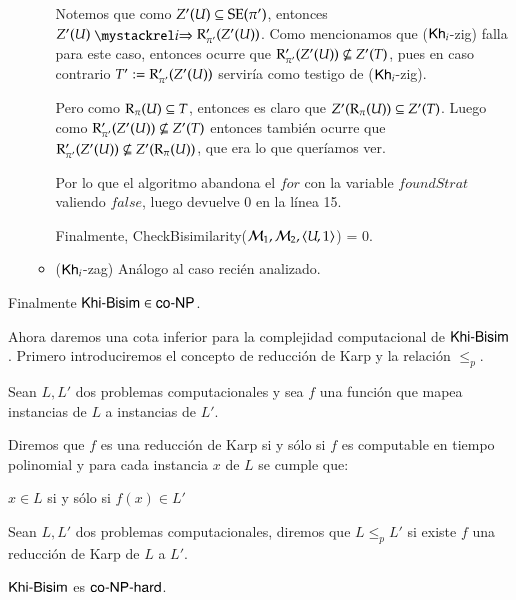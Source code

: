 \begin{demostracion}
\begin{itemize}
\begin{itemize}
            Notemos que como $Z'(U) \subseteq \mathrm{SE}(\pi')$, entonces $Z'(U) \ultsExecAgi \R'_{\pi'}(Z'(U))$. 
            Como mencionamos que ($\mathsf{Kh}_i$-zig) falla para este caso, entonces ocurre que 
            $\mathrm{R}'_{\pi'}(Z'(U)) \not \subseteq Z'(T)$, pues en caso contrario $T' := \mathrm{R}'_{\pi'}(Z'(U))$ serviría como 
            testigo de ($\mathsf{Kh}_i$-zig).

            Pero como $\mathrm{R}_\pi(U) \subseteq T$, entonces es claro que $Z'(\mathrm{R}_\pi(U)) \subseteq Z'(T)$. Luego como 
            $\mathrm{R}'_{\pi'}(Z'(U)) \not \subseteq Z'(T)$ entonces también ocurre que $\mathrm{R}'_{\pi'}(Z'(U)) \not \subseteq Z'(\mathrm{R}_\pi(U))$, 
            que era lo que queríamos ver.

            Por lo que el algoritmo abandona el $for$ con la variable $foundStrat$ valiendo $false$, luego devuelve 0 en la línea 15.

            Finalmente, CheckBisimilarity($\mathcal{M}_1,\mathcal{M}_2,\langle U,1 \rangle$) = 0.

            \item ($\mathsf{Kh}_i$-zag) Análogo al caso recién analizado.
        \end{itemize}
    \end{itemize}
    Finalmente $\rm\textsf{Khi-Bisim} \in \rm\textsf{co-NP}$.
\end{demostracion}

Ahora daremos una cota inferior para la complejidad computacional de $\rm\textsf{Khi-Bisim}$. Primero introduciremos el concepto 
de reducción de Karp y la relación $\leq_p$. 

\begin{definicion}
    Sean $L, L'$ dos problemas computacionales y sea $f$ una función que mapea instancias de $L$ a instancias de $L'$.

    Diremos que $f$ es una reducción de Karp si y sólo si $f$ es computable en tiempo polinomial y para cada instancia $x$ de $L$ 
    se cumple que:

    \begin{center}
        $x \in L$ si y sólo si $f(x) \in L'$
    \end{center}
\end{definicion}

\begin{definicion}
    Sean $L, L'$ dos problemas computacionales, diremos que $L \leq_p L'$ si existe $f$ una reducción de Karp de $L$ a 
    $L'$. 
\end{definicion}


\begin{lema}
    $\rm\textsf{Khi-Bisim}$ es $\rm\textsf{co-NP-hard}$.
\end{lema}

